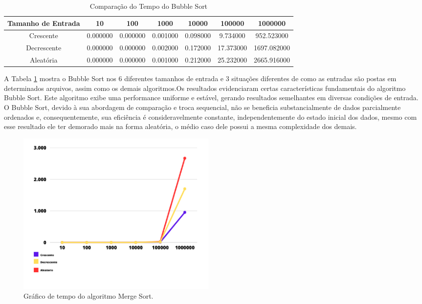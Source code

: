 \begin{table}[h]
    \centering
    \caption{Comparação do Tempo do Bubble Sort}
    \begin{tabular}{|c|c|c|c|c|c|c|}
        \hline
        Tamanho de Entrada & 10 & 100 & 1000 & 10000 & 100000 & 1000000 \\
        \hline
        Crescente & 0.000000 & 0.000000 & 0.001000 & 0.098000 & 9.734000 & 952.523000 \\
        \hline
        Decrescente & 0.000000 & 0.000000 & 0.002000 & 0.172000 & 17.373000 & 1697.082000 \\
        \hline
        Aleatória & 0.000000 & 0.000000 & 0.001000 & 0.212000 & 25.232000 & 2665.916000 \\
        \hline
    \end{tabular}
    \label{tab:comparacaobubble}
\end{table}

A Tabela \ref{tab:comparacaobubble} mostra o Bubble Sort nos 6 diferentes tamanhos
de entrada e 3 situações diferentes de como as entradas são postas em determinados arquivos, assim como os demais algoritmos.Os resultados evidenciaram certas características fundamentais do algoritmo Bubble Sort. Este algoritmo exibe uma performance uniforme e estável, gerando resultados semelhantes em diversas condições de entrada. O Bubble Sort, devido à sua abordagem de comparação e troca sequencial, não se beneficia substancialmente de dados parcialmente ordenados e, consequentemente, sua eficiência é consideravelmente constante, independentemente do estado inicial dos dados, mesmo com esse resultado ele ter demorado mais na forma aleatória, o médio caso dele possui a mesma complexidade dos demais.


\begin{figure}[h!]
    \centering
    \includegraphics[width = 10cm]{Imagens/Bubble Sort/Captura de tela 2023-09-27 211808.png}
    \caption{Gráfico de tempo do algoritmo Merge Sort.}
    \label{fig:b10}
\end{figure}